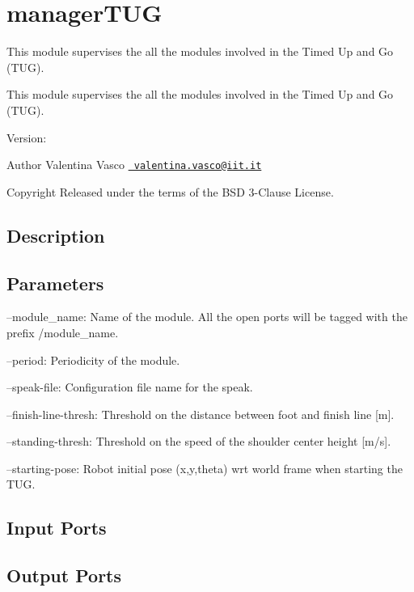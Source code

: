 \section{manager\+T\+UG}
\label{group__managerTUG}


This module supervises the all the modules involved in the Timed Up and Go (T\+UG).  


This module supervises the all the modules involved in the Timed Up and Go (T\+UG). 

Version\+: \begin{DoxyAuthor}{Author}
Valentina Vasco \href{mailto:valentina.vasco@iit.it}{\texttt{ valentina.\+vasco@iit.\+it}} ~\newline
 
\end{DoxyAuthor}
\begin{DoxyCopyright}{Copyright}
Released under the terms of the B\+SD 3-\/Clause License. 
\end{DoxyCopyright}
\hypertarget{group__skeletonViewer_intro_sec}{}\subsection{Description}\label{group__skeletonViewer_intro_sec}
\hypertarget{group__skeletonViewer_parameters_sec}{}\subsection{Parameters}\label{group__skeletonViewer_parameters_sec}

\begin{DoxyItemize}
\item --module\+\_\+name\+: Name of the module. All the open ports will be tagged with the prefix /module\+\_\+name.
\item --period\+: Periodicity of the module.
\item --speak-\/file\+: Configuration file name for the speak.
\item --finish-\/line-\/thresh\+: Threshold on the distance between foot and finish line \mbox{[}m\mbox{]}.
\item --standing-\/thresh\+: Threshold on the speed of the shoulder center height \mbox{[}m/s\mbox{]}.
\item --starting-\/pose\+: Robot initial pose (x,y,theta) wrt world frame when starting the T\+UG. 
\end{DoxyItemize}\hypertarget{group__skeletonViewer_inputports_sec}{}\subsection{Input Ports}\label{group__skeletonViewer_inputports_sec}
\hypertarget{group__skeletonViewer_outputports_sec}{}\subsection{Output Ports}\label{group__skeletonViewer_outputports_sec}

